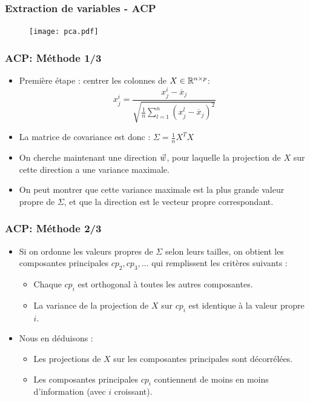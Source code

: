 \begin{frame}
  \frametitle{Extraction de variables - ACP}
	\begin{figure}[htb]
	  \centering
	  \texttt{[image: pca.pdf]}
	\end{figure}
\end{frame}

\begin{frame}
\frametitle{ACP: Méthode 1/3}
  \begin{itemize}
  	\item Première étape : centrer les colonnes de $X \in {\mathbb R}^{n \times p}$: 
 \begin{equation*}
 x^i_j = \frac{x_j^i - \overline{x}_j}{\sqrt{\frac{1}{n}\sum_{l=1}^n(x_j^l - \overline{x}_j)^2}} 
 \end{equation*}
 	\item La matrice de covariance est donc : $\Sigma = \frac1n X^TX$ 
 	\item On cherche maintenant une direction $\vec{w}$, pour laquelle la projection de $X$ sur cette direction a une variance maximale. 
 	\item On peut montrer que cette variance maximale est la plus grande valeur propre de $\Sigma$, et que la direction est le vecteur propre correspondant. 
  \end{itemize}
\end{frame}

\begin{frame}
\frametitle{ACP: Méthode 2/3}
  \begin{itemize}
  	\item Si on ordonne les valeurs propres de $\Sigma$ selon leurs tailles, on obtient les composantes principales $cp_2, cp_3, \ldots$ qui remplissent les critères suivants : 
  	\begin{itemize}
  		\item Chaque $cp_i$ est orthogonal à toutes les autres composantes.
  		\item La variance de la projection de $X$ sur $cp_i$ est identique à la valeur propre $i$. 
  	\end{itemize}
  	\item Nous en déduisons : 
  	\begin{itemize}
  		\item Les projections de $X$ sur les composantes principales sont décorrélées. 
  		\item Les composantes principales $cp_i$ contiennent de moins en moins d'information (avec $i$ croissant). 
  	\end{itemize}
  \end{itemize}
\end{frame}

